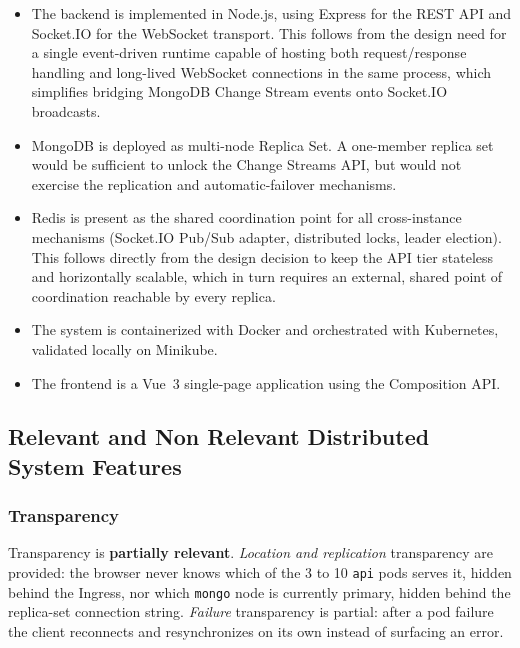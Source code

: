 \documentclass{scrartcl}
\begin{document}
\begin{itemize}
  \item[\textbf{I1}] The backend is implemented in Node.js, using Express for the REST API and Socket.IO for the WebSocket transport. This follows from the design need for a single event-driven runtime capable of hosting both request/response handling and long-lived WebSocket connections in the same process, which simplifies bridging MongoDB Change Stream events onto Socket.IO broadcasts.

  \item[\textbf{I2}] MongoDB is deployed as multi-node Replica Set. A one-member replica set would be sufficient to unlock the Change Streams API, but would not exercise the replication and automatic-failover mechanisms.

  \item[\textbf{I3}] Redis is present as the shared coordination point for all cross-instance mechanisms (Socket.IO Pub/Sub adapter, distributed locks, leader election). This follows directly from the design decision to keep the API tier stateless and horizontally scalable, which in turn requires an external, shared point of coordination reachable by every replica.

  \item[\textbf{I4}] The system is containerized with Docker and orchestrated with Kubernetes, validated locally on Minikube.

  \item[\textbf{I5}] The frontend is a Vue~3 single-page application using the Composition API.
\end{itemize}

\subsection{Relevant and Non Relevant Distributed System Features}
\label{ds-features}

\subsubsection{Transparency}

Transparency is \textbf{partially relevant}. \emph{Location and replication} transparency are provided: the browser never knows which of the 3 to 10 \texttt{api} pods serves it, hidden behind the Ingress, nor which \texttt{mongo} node is currently primary, hidden behind the replica-set connection string. \emph{Failure} transparency is partial: after a pod failure the client reconnects and resynchronizes on its own instead of surfacing an error. 
\end{document}
